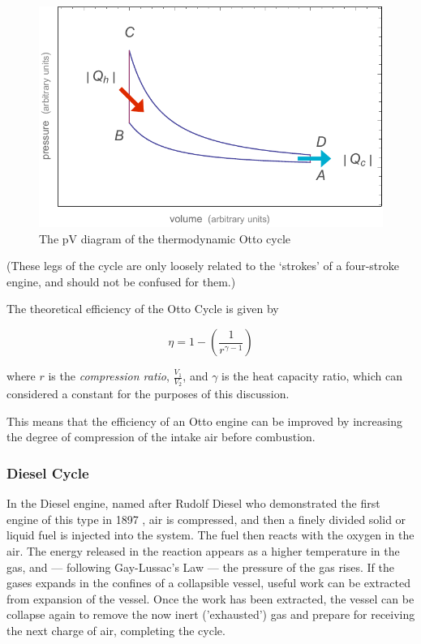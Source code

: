 \begin{figure}
\centering
\includegraphics[width=\textwidth]{Figures/otto-cycle}
\decoRule
\caption[The Otto cycle]{The pV diagram of the thermodynamic Otto cycle}
\label{fig:otto-cycle}
\end{figure}

(These legs of the cycle are only loosely related to the `strokes' of a
four-stroke engine, and should not be confused for them.)

The theoretical efficiency of the Otto Cycle is given by 

\begin{equation}
	\eta = 1 - (\frac{1}{r^{\gamma-1}})
\label{eqn:otto-efficiency}
\end{equation}

where \(r\) is the \textit{compression ratio}, \( \frac{V_1}{V_2} \), and
\(\gamma\) is the heat capacity ratio, which can considered a constant for the
purposes of this discussion.

This means that the efficiency of an Otto engine can be improved by increasing
the degree of compression of the intake air before combustion. 

\subsubsection{Diesel Cycle}

In the Diesel engine, named after Rudolf Diesel who demonstrated the first
engine of this type in 1897 \autocite[Chapter 14]{Cummins1989}, air is
compressed, and then a finely divided solid or liquid fuel is injected into the
system. The fuel then reacts with the oxygen in the air. The energy released in
the reaction appears as a higher temperature in the gas, and --- following
Gay-Lussac's Law --- the pressure of the gas rises. If the gases expands in the
confines of a collapsible vessel, useful work can be extracted from expansion of
the vessel. Once the work has been extracted, the vessel can be collapse again
to remove the now inert ('exhausted') gas and prepare for receiving the next
charge of air, completing the cycle.


